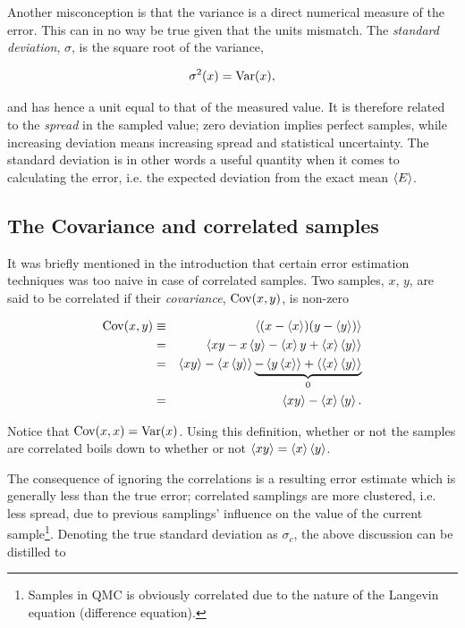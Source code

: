 Another misconception is that the variance is a direct numerical measure of the error. This can in no way be true given that the units mismatch. The \textit{standard deviation}, $\sigma$, is the square root of the variance,

\begin{equation}
\label{eq:stdNaive}
 \sigma^2(x) = \mathrm{Var}(x),
\end{equation}


and has hence a unit equal to that of the measured value. It is therefore related to the \textit{spread} in the sampled value; zero deviation implies perfect samples, while increasing deviation means increasing spread and statistical uncertainty. The standard deviation is in other words a useful quantity when it comes to calculating the error, i.e. the expected deviation from the exact mean $\left< E \right>$.

\subsection{The Covariance and correlated samples}

It was briefly mentioned in the introduction that certain error estimation techniques was too naive in case of correlated samples. Two samples, $x$, $y$, are said to be correlated if their \textit{covariance}, $\mathrm{Cov}(x, y)$, is non-zero

\begin{eqnarray}
\label{eq:covariance}
 \mathrm{Cov}(x, y) &\equiv& \left< (x - \left< x \right>)(y - \left< y \right>) \right> \nonumber\\
            &=& \left< xy - x\left< y \right> - \left< x \right>y + \left< x \right>\left< y \right> \right> \nonumber\\
            &=& \left< xy \right> - \left< x\left< y \right> \right> \underbrace{-\left< y\left< x \right> \right> + \left< \left< x \right>\left< y \right> \right>}_{0} \nonumber\\
            &=& \left< xy \right> - \left< x \right>\left< y \right>.
\end{eqnarray}

Notice that $\mathrm{Cov}(x,x) = \mathrm{Var}(x)$. Using this definition, whether or not the samples are correlated boils down to whether or not $\left< xy \right> = \left< x \right>\left< y \right>$. 

The consequence of ignoring the correlations is a resulting error estimate which is generally less than the true error; correlated samplings are more clustered, i.e. less spread, due to previous samplings' influence on the value of the current sample\footnote{Samples in QMC is obviously correlated due to the nature of the Langevin equation (difference equation).}. Denoting the true standard deviation as $\sigma_c$, the above discussion can be distilled to

